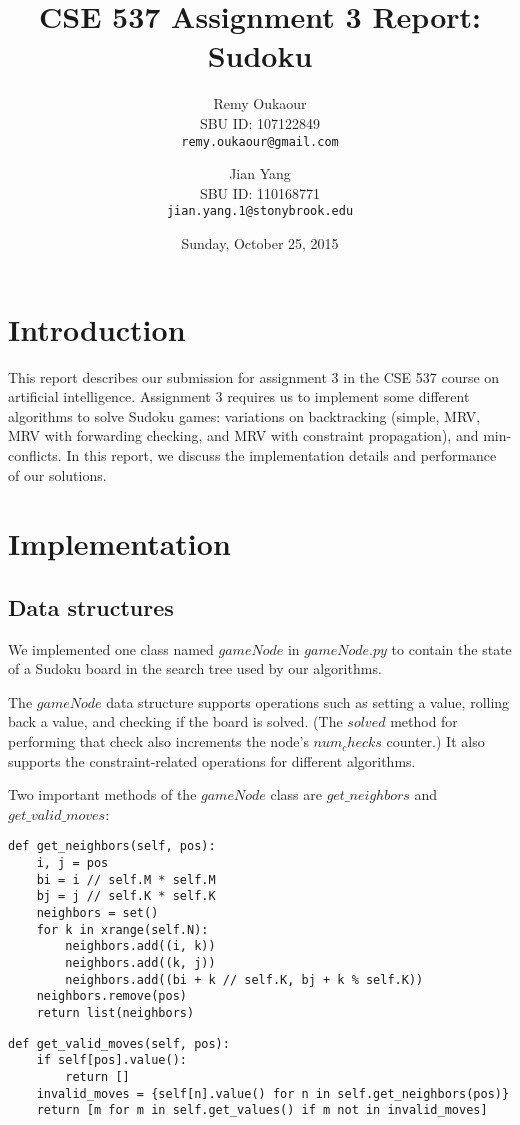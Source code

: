 \documentclass[11pt]{article}
\title{CSE 537 Assignment 3 Report: Sudoku}
\author{
Remy Oukaour \\
	{\small SBU ID: 107122849}\\
	{\small \texttt{remy.oukaour@gmail.com}}
\and
Jian Yang \\
	{\small SBU ID: 110168771}\\
	{\small \texttt{jian.yang.1@stonybrook.edu}}
}
\date{Sunday, October 25, 2015}
\begin{document}
\maketitle

\section{Introduction}

This report describes our submission for assignment 3 in the CSE 537 course on
artificial intelligence. Assignment 3 requires us to implement some different
algorithms to solve Sudoku games: variations on backtracking (simple, MRV,
MRV with forwarding checking, and MRV with constraint propagation), and
min-conflicts. In this report, we discuss the implementation details and
performance of our solutions.

\section{Implementation}

\subsection{Data structures}

We implemented one class named $gameNode$ in $gameNode.py$ to contain the state of a
Sudoku board in the search tree used by our algorithms.

The $gameNode$ data structure supports operations such as setting a value, rolling back
a value, and checking if the board is solved. (The $solved$ method for performing that
check also increments the node's $num_checks$ counter.) It also supports the
constraint-related operations for different algorithms.

Two important methods of the $gameNode$ class are $get\_neighbors$ and $get\_valid\_moves$:

\lstset{language=Python}
\begin{lstlisting}[frame=single]
def get_neighbors(self, pos):
	i, j = pos
	bi = i // self.M * self.M
	bj = j // self.K * self.K
	neighbors = set()
	for k in xrange(self.N):
		neighbors.add((i, k))
		neighbors.add((k, j))
		neighbors.add((bi + k // self.K, bj + k % self.K))
	neighbors.remove(pos)
	return list(neighbors)
\end{lstlisting}

\lstset{language=Python}
\begin{lstlisting}[frame=single]
def get_valid_moves(self, pos):
	if self[pos].value():
		return []
	invalid_moves = {self[n].value() for n in self.get_neighbors(pos)}
	return [m for m in self.get_values() if m not in invalid_moves]
\end{lstlisting}
\end{document}
